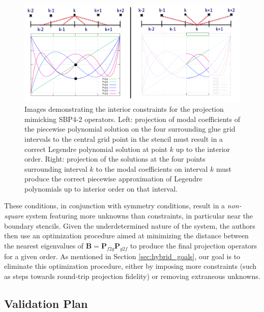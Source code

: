 \begin{figure}
\centering
\includegraphics[width=0.9\linewidth,trim=4 4 4 4,clip]{figures/projection_layout.png}
\caption{Images demonstrating the interior constraints for the projection mimicking SBP4-2
	 operators. Left: projection of modal coefficients of the piecewise polynomial solution
	 on the four surrounding glue grid intervals to the central grid point in the stencil must
	 result in a correct Legendre polynomial solution at point $k$ up to the interior order.
	 Right: projection of the solutions at the four points surrounding interval $k$ to the
	 modal coefficients on interval $k$ must produce the correct piecewise approximation of
	 Legendre polynomials up to interior order on that interval.}
\label{fig:projection_layout}
\end{figure}
These conditions, in conjunction with symmetry conditions, result in a \emph{non-square}
system featuring more unknowns than constraints, in particular near the boundary stencils.
Given the underdetermined nature of the system, the authors then use an optimization
procedure aimed at minimizing the distance between the nearest eigenvalues of $\pmb{B} =
\pmb{P}_{f2g}\pmb{P}_{g2f}$ to produce the final projection operators for a given order.
As mentioned in Section \ref{sec:hybrid_goals}, our goal is to eliminate this optimization
procedure, either by imposing more constraints (such as steps towards round-trip projection
fidelity) or removing extraneous unknowns.

\subsection{Validation Plan}

